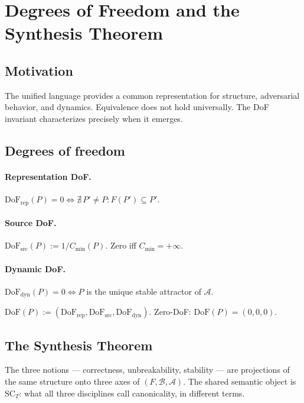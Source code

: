 \section{Degrees of Freedom and the Synthesis Theorem}
\label{sec:synthesis-main}

\subsection{Motivation}

The unified language provides a common representation for structure,
adversarial behavior, and dynamics. Equivalence does not hold universally.
The DoF invariant characterizes precisely when it emerges.

\subsection{Degrees of freedom}
\label{subsec:dof-main}

\paragraph{Representation DoF.}
$\mathrm{DoF}_{\mathrm{rep}}(P)=0 \iff \nexists\,P'\neq P:F(P')\subseteq P'.$

\paragraph{Source DoF.}
$\mathrm{DoF}_{\mathrm{src}}(P):=1/C_{\min}(P).$ Zero iff $C_{\min}=+\infty$.

\paragraph{Dynamic DoF.}
$\mathrm{DoF}_{\mathrm{dyn}}(P)=0 \iff P$ is the unique stable attractor of $\mathcal{A}$.

\begin{definition}\label{def:dof-main}
$\mathrm{DoF}(P):=(\mathrm{DoF}_{\mathrm{rep}},\mathrm{DoF}_{\mathrm{src}},\mathrm{DoF}_{\mathrm{dyn}})$.
Zero-DoF: $\mathrm{DoF}(P)=(0,0,0)$.
\end{definition}

\subsection{The Synthesis Theorem}
\label{subsec:synthesis}

The three notions --- correctness, unbreakability, stability --- are projections
of the same structure onto three axes of $(F,\mathcal{B},\mathcal{A})$.
The shared semantic object is $\mathrm{SC}_T$: what all three disciplines
call canonicality, in different terms.

